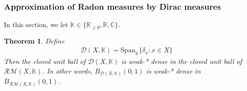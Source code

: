 \documentclass[12pt,b5paper,notitlepage]{article}
\theoremstyle{definition}
\theoremstyle{plain}
\newtheorem{thm}[df]{Theorem}
\newcommand{\ovl}{\overline}
\newcommand{\Span}{\mathrm{Span}}
\newcommand{\Kbb}{\mathbb K}
\newcommand{\Cbb}{\mathbb C}
\newcommand{\Rbb}{\mathbb R}
\newcommand{\MD}{\mathcal D}
\newcommand{\RM}{\mathcal {RM}}
\numberwithin{equation}{section}
\begin{document}
\subsubsection{Approximation of Radon measures by Dirac measures}

In this section, we let $\Kbb\in\{\Rbb_{\geq0},\Rbb,\Cbb\}$. 

\begin{thm}\label{lb105}
Define
\begin{align*}
\MD(X,\Kbb)=\Span_\Kbb\{\delta_x:x\in X\}
\end{align*}
Then the closed unit ball of $\MD(X,\Kbb)$ is weak-* dense in the closed unit ball of $\RM(X,\Kbb)$. In other words, $\ovl B_{\MD(X,\Kbb)}(0,1)$ is weak-* dense in $\ovl B_{\RM(X,\Kbb)}(0,1)$.
\end{thm}
\end{document}
